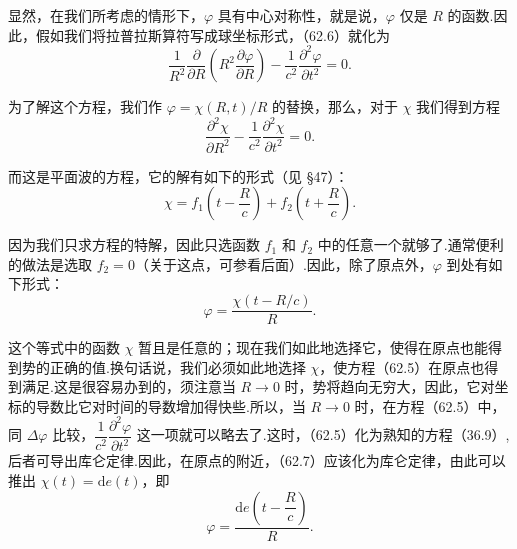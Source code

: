 显然，在我们所考虑的情形下，$\varphi$ 具有中心对称性，就是说，$\varphi$ 仅是 $R$ 的函数.因此，假如我们将拉普拉斯算符写成球坐标形式，（62.6）就化为
\begin{equation*}
  \frac{1}{R^2}\frac{\partial}{\partial R}
  \left(R^2\frac{\partial\varphi}{\partial R}\right)
  -\frac{1}{c^2}\frac{\partial^2\varphi}{\partial t^2}=0.
\end{equation*}

为了解这个方程，我们作 $\varphi=\chi(R,t)/R$ 的替换，那么，对于 $\chi$ 我们得到方程
\begin{equation*}
  \frac{\partial^2\chi}{\partial R^2}
  -\frac{1}{c^2}\frac{\partial^2\chi}{\partial t^2}=0.
\end{equation*}

而这是平面波的方程，它的解有如下的形式（见 §47）：
\begin{equation*}
  \chi=f_1\left(t-\frac{R}{c}\right)+f_2\left(t+\frac{R}{c}\right).
\end{equation*}

因为我们只求方程的特解，因此只选函数 $f_1$ 和 $f_2$ 中的任意一个就够了.通常便利的做法是选取 $f_2=0$（关于这点，可参看后面）.因此，除了原点外，$\varphi$ 到处有如下形式：
\begin{equation}
  \varphi=\frac{\chi(t-R/c)}{R}.
\end{equation}

这个等式中的函数 $\chi$ 暂且是任意的；现在我们如此地选择它，使得在原点也能得到势的正确的值.换句话说，我们必须如此地选择 $\chi$，使方程（62.5）在原点也得到满足.这是很容易办到的，须注意当 $R\to 0$ 时，势将趋向无穷大，因此，它对坐标的导数比它对时间的导数增加得快些.所以，当 $R\to 0$ 时，在方程（62.5）中，同 $\Delta\varphi$ 比较，$\dfrac{1}{c^2}\dfrac{\partial^2\varphi}{\partial t^2}$ 这一项就可以略去了.这时，（62.5）化为熟知的方程（36.9）,后者可导出库仑定律.因此，在原点的附近，（62.7）应该化为库仑定律，由此可以推出 $\chi(t)=\mathrm{d}e(t)$，即
\begin{equation*}
  \varphi=\frac{\mathrm{d}e\left(t-\dfrac{R}{c}\right)}{R}.
\end{equation*}

